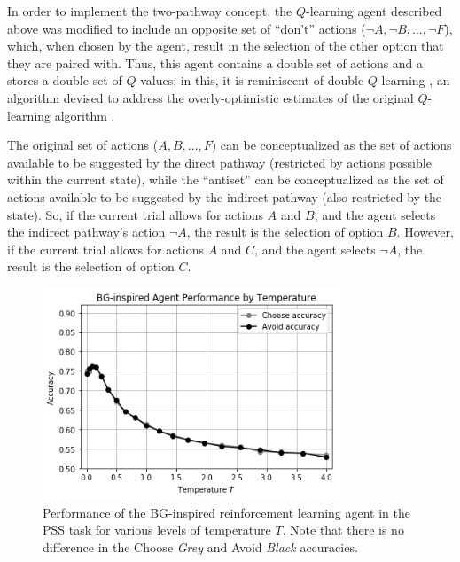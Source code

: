 \documentclass[10pt,letterpaper]{article}
\begin{document}
In order to implement the two-pathway concept, the $Q$-learning agent described above was modified to include an opposite set of ``don't'' actions ($\neg A, \neg B, \dots, \neg F$), which, when chosen by the agent, result in the selection of the other option that they are paired with. Thus, this agent contains a double set of actions and a stores a double set of $Q$-values; in this, it is reminiscent of double $Q$-learning \cite{hasselt2010double,van2016deep}, an algorithm devised to address the overly-optimistic estimates of the original $Q$-learning algorithm \cite{watkins1992q}.

The original set of actions ($A, B, \dots, F$) can be conceptualized as the set of actions available to be suggested by the direct pathway (restricted by actions possible within the current state), while the ``antiset'' can be conceptualized as the set of actions available to be suggested by the indirect pathway (also restricted by the state). So, if the current trial allows for actions $A$ and $B$, and the agent selects the indirect pathway's action $\neg A$, the result is the selection of option $B$. However, if the current trial allows for actions $A$ and $C$, and the agent selects $\neg A$, the result is the selection of option $C$.

\begin{figure}[ht]
	\begin{center}
		\includegraphics[width=3.5in]{bg-agent-performance.png}
	\end{center}
	\caption{Performance of the BG-inspired reinforcement learning agent in the PSS task for various levels of temperature $T$. Note that there is no difference in the Choose \emph{Grey} and Avoid \emph{Black} accuracies.}
	\label{bg-agents}
\end{figure}
\end{document}

